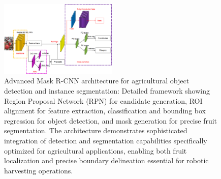 \documentclass{ieeeaccess}
\begin{document}
\begin{figure}[hbtp]
\centering
\includegraphics[width=0.5\textwidth]{fig_maskRcnn.png}
\caption{Advanced Mask R-CNN architecture for agricultural object detection and instance segmentation: Detailed framework showing Region Proposal Network (RPN) for candidate generation, ROI alignment for feature extraction, classification and bounding box regression for object detection, and mask generation for precise fruit segmentation. The architecture demonstrates sophisticated integration of detection and segmentation capabilities specifically optimized for agricultural applications, enabling both fruit localization and precise boundary delineation essential for robotic harvesting operations.~\cite{he2017mask}}
\label{fig:mask_rcnn}
\end{figure}
\iffalse
\end{document}
